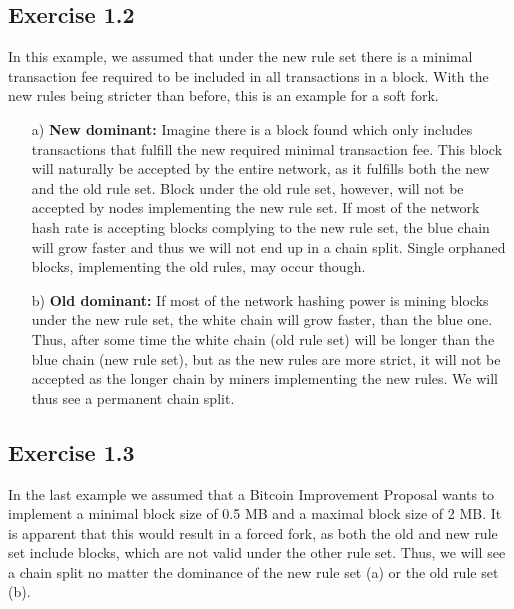 \documentclass[12pt]{article}
\begin{document}
	\subsection*{Exercise 1.2}
	In this example, we assumed that under the new rule set there is a minimal transaction fee required to be included in all transactions in a block. With the new rules being stricter than before, this is an example for a soft fork.
	\begin{itemize}
		\item[a)] \textbf{New dominant:} Imagine there is a block found which only includes transactions that fulfill the new required minimal transaction fee. This block will naturally be accepted by the entire network, as it fulfills both the new and the old rule set. Block under the old rule set, however, will not be accepted by nodes implementing the new rule set. If most of the network hash rate is accepting blocks complying to the new rule set, the blue chain will grow faster and thus we will not end up in a chain split. Single orphaned blocks, implementing the old rules, may occur though.\vspace{1cm}
		\item[b)] \textbf{Old dominant:} If most of the network hashing power is mining blocks under the new rule set, the white chain will grow faster, than the blue one. Thus, after some time the white chain (old rule set) will be longer than the blue chain (new rule set), but as the new rules are more strict, it will not be accepted as the longer chain by miners implementing the new rules. We will thus see a permanent chain split.
	\end{itemize}
	
	\subsection*{Exercise 1.3}
	In the last example we assumed that a Bitcoin Improvement Proposal wants to implement a minimal block size of 0.5 MB and a maximal block size of 2 MB. It is apparent that this would result in a forced fork, as both the old and new rule set include blocks, which are not valid under the other rule set. Thus, we will see a chain split no matter the dominance of the new rule set (a) or the old rule set (b).
	
\end{document}
